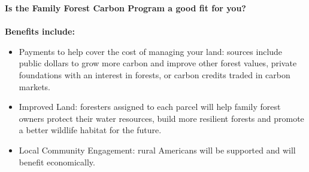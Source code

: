 \documentclass{article}\usepackage[]{graphicx}\usepackage[]{color}
\begin{document}
{\Large{\textbf{Is the Family Forest Carbon Program a good fit for you?}}} \\
\vspace{2ex}\\
{\large{\textbf{Benefits include:}}}
  \begin{itemize}
  \item Payments to help cover the cost of managing your land: sources include public dollars to grow more carbon and improve other forest values, private foundations with an interest in forests, or carbon credits traded in carbon markets.
  \item Improved Land: foresters assigned to each parcel will help family forest owners protect their water resources, build more resilient forests and promote a better wildlife habitat for the future.
  \item Local Community Engagement: rural Americans will be supported and will benefit economically.
  \end{itemize}
\end{document}
